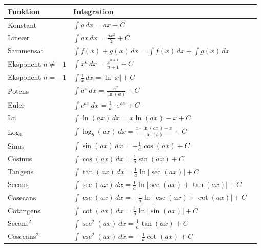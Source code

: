 
\begin{table}[H]
\centering
\begingroup
\small
\renewcommand{\arraystretch}{1.6}
\begin{tabular}{@{}>{\raggedright}p{4.65cm}ll@{}}
\toprule
\textbf{Funktion} & \textbf{Integration} \\
\midrule
Konstant & $\int a \, dx = ax + C$ \\
Lineær & $\int ax \, dx = \frac{a x^2}{2} + C$ \\
Sammensat & $\int f(x) + g(x) \, dx = \int f(x) \, dx + \int g(x) \, dx$ \\
\midrule
Eksponent $n \neq -1$ & $\int x^n \, dx = \frac{x^{n+1}}{n+1} + C$ \\
Eksponent $n = -1$ & $\int \frac{1}{x} \, dx = \ln|x| + C$ \\
\midrule
Potens & $\int a^{x} \, dx = \frac{a^{x}}{\ln(a)} + C$ \\
Euler & $\int e^{ax} \, dx = \frac{1}{a} \cdot e^{ax} + C$ \\
Ln & $\int \ln(ax) \, dx = x \ln(ax) - x + C$ \\
Log$_\text{b}$ & $\int \log_b(ax) \, dx = \frac{x \cdot \ln(ax) - x}{\ln(b)} + C$ \\
\midrule
Sinus & $\int \sin(ax) \, dx = -\frac{1}{a} \cos(ax) + C$ \\
Cosinus & $\int \cos(ax) \, dx = \frac{1}{a} \sin(ax) + C$ \\
Tangens & $\int \tan(ax) \, dx = \frac{1}{a} \ln|\sec(ax)| + C$ \\
Secans & $\int \sec(ax) \, dx = \frac{1}{a} \ln|\sec(ax) + \tan(ax)| + C$ \\
Cosecans & $\int \csc(ax) \, dx = -\frac{1}{a} \ln|\csc(ax) + \cot(ax)| + C$ \\
Cotangens & $\int \cot(ax) \, dx = \frac{1}{a} \ln|\sin(ax)| + C$ \\
\midrule
Secans$^2$ & $\int \sec^2(ax) \, dx = \frac{1}{a} \tan(ax) + C$ \\
Cosecans$^2$ & $\int \csc^2(ax) \, dx = -\frac{1}{a} \cot(ax) + C$ \\
\bottomrule
\end{tabular}
\endgroup
\end{table}